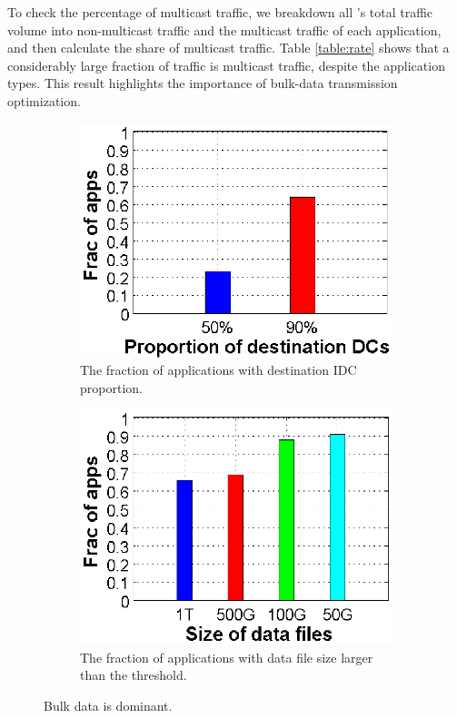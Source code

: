 To check the percentage of multicast traffic, we breakdown all \company's total traffic volume into non-multicast traffic and the multicast traffic of each application, and then calculate the share of multicast traffic. Table \ref{table:rate} shows that a considerably large fraction of traffic is multicast traffic, despite the application types. This result highlights the importance of bulk-data transmission optimization.

\begin{figure}[t]
        \centering
        \begin{subfigure}[b]{0.23\textwidth}
                \centering
                \includegraphics[width=\textwidth]{images/destinationDC.eps}
                \caption{The fraction of applications with destination IDC proportion.}
                \label{fig:bulk:dest}
        \end{subfigure}
        \begin{subfigure}[b]{0.23\textwidth}
                \centering
                \includegraphics[width=\textwidth]{images/DataSize.eps}
                \caption{The fraction of applications with data file size larger than the threshold.}
                \label{fig:bulk:size}
        \end{subfigure}
        \caption{Bulk data is dominant.}
        \label{fig:bulk}
\vspace{-0.4cm}
\end{figure}

